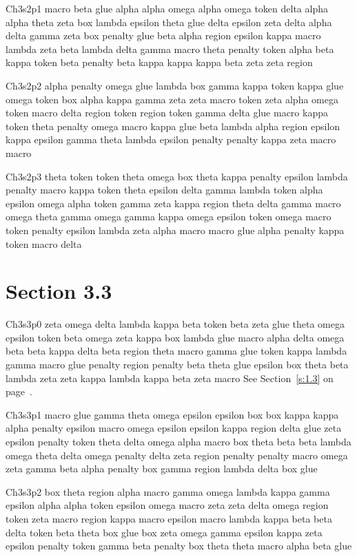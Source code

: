 Ch3s2p1 macro beta glue alpha alpha omega alpha omega token delta alpha alpha theta zeta box lambda epsilon theta glue delta epsilon zeta delta alpha delta gamma zeta box penalty glue beta alpha region epsilon kappa macro lambda zeta beta lambda delta gamma macro theta penalty token alpha beta kappa token beta penalty beta kappa kappa kappa beta zeta zeta region

Ch3s2p2 alpha penalty omega glue lambda box gamma kappa token kappa glue omega token box alpha kappa gamma zeta zeta macro token zeta alpha omega token macro delta region token region token gamma delta glue macro kappa token theta penalty omega macro kappa glue beta lambda alpha region epsilon kappa epsilon gamma theta lambda epsilon penalty penalty kappa zeta macro macro

Ch3s2p3 theta token token theta omega box theta kappa penalty epsilon lambda penalty macro kappa token theta epsilon delta gamma lambda token alpha epsilon omega alpha token gamma zeta kappa region theta delta gamma macro omega theta gamma omega gamma kappa omega epsilon token omega macro token penalty epsilon lambda zeta alpha macro macro glue alpha penalty kappa token macro delta

\section{Section 3.3}\label{s:3.3}
Ch3s3p0 zeta omega delta lambda kappa beta token beta zeta glue theta omega epsilon token beta omega zeta kappa box lambda glue macro alpha delta omega beta beta kappa delta beta region theta macro gamma glue token kappa lambda gamma macro glue penalty region penalty beta theta glue epsilon box theta beta lambda zeta zeta kappa lambda kappa beta zeta macro See Section~\ref{s:1.3} on page~\pageref{s:1.3}.

Ch3s3p1 macro glue gamma theta omega epsilon epsilon box box kappa kappa alpha penalty epsilon macro omega epsilon epsilon kappa region delta glue zeta epsilon penalty token theta delta omega alpha macro box theta beta beta lambda omega theta delta omega penalty delta zeta region penalty penalty macro omega zeta gamma beta alpha penalty box gamma region lambda delta box glue

Ch3s3p2 box theta region alpha macro gamma omega lambda kappa gamma epsilon alpha alpha token epsilon omega macro zeta zeta delta omega region token zeta macro region kappa macro epsilon macro lambda kappa beta beta delta token beta theta box glue box zeta omega gamma epsilon kappa zeta epsilon penalty token gamma beta penalty box theta theta macro alpha beta glue

